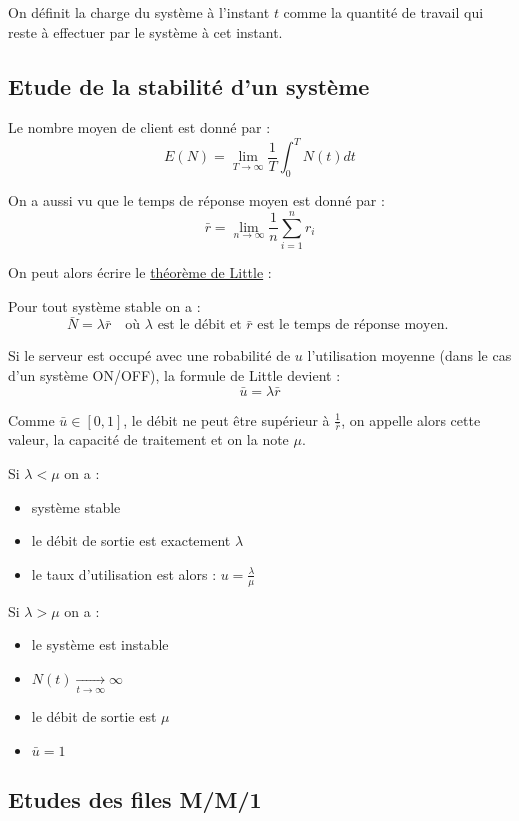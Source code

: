 \documentclass[a4paper, 11pt, fleqn]{article}
\begin{document}
On définit la charge du système à l'instant $t$ comme la quantité de travail qui reste à effectuer
par le système à cet instant.

\subsection{Etude de la stabilité d'un système}

Le nombre moyen de client est donné par : $$
E (N) = \lim_{T \rightarrow \infty} \frac{1}{T} \int_0^T N(t) dt $$

On a aussi vu que le temps de réponse moyen est donné par : $$
\bar r = \lim_{n\rightarrow \infty} \frac{1}{n} \sum_{i=1}^n r_i $$

On peut alors écrire le \underline{théorème de Little} :

Pour tout système stable on a : $$
\bar N = \lambda \bar r \quad \mbox{où } \lambda \mbox{ est le débit et } \bar r \mbox{ est le temps
de réponse moyen. }$$

Si le serveur est occupé avec une robabilité de $u$ l'utilisation moyenne (dans le cas d'un système ON/OFF), la formule de Little devient : $$
\bar u = \lambda \bar r $$

Comme $\bar u \in [0, 1]$, le débit ne peut être supérieur à $\frac{1}{\bar r}$, on appelle alors
cette valeur, la capacité de traitement et on la note $\mu$.


Si $\lambda < \mu$ on a : \begin{itemize}
	\item système stable
	\item le débit de sortie est exactement $\lambda$
	\item le taux d'utilisation est alors : $ u = \frac{\lambda}{\mu} $
\end{itemize}

Si $\lambda > \mu$ on a : \begin{itemize}
	\item le système est instable
	\item $N(t) \underset{t \rightarrow \infty}{\longrightarrow} \infty$
	\item le débit de sortie est $\mu$
	\item $\bar u = 1$
\end{itemize}

\subsection{Etudes des files M/M/1}
\end{document}
